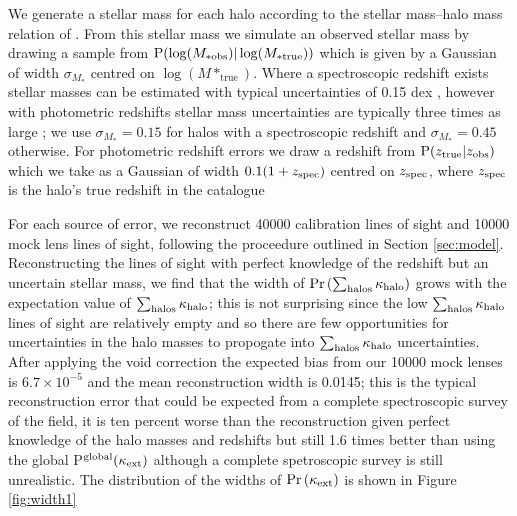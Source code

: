\documentclass[useAMS,usenatbib]{mn2e}
\begin{document}
We generate a stellar mass for each halo according to the stellar mass--halo mass relation of \citet{BehrooziEtal2010}. From this stellar mass we simulate 
an observed stellar mass by drawing a sample from ${\rm P}(\log(M_{* \mathrm {obs}})|\log(M_{* \mathrm {true}}))$ which is given by  a Gaussian of width $\sigma_{M_*}$ centred on $\log(M*_{\mathrm {true}})$. Where a spectroscopic redshift exists stellar masses can be estimated with typical uncertainties of 0.15 dex \citep{xxx}, however with photometric redshifts stellar mass uncertainties are typically three times as large \citep{xxx}; we use $\sigma_{M_*}=0.15$ for halos with a spectroscopic redshift and $\sigma_{M_*}=0.45$ otherwise.  For photometric redshift errors we draw a redshift from ${\rm P}(z_{\rm true}|z_{\rm obs})$ which we take as a Gaussian of width $0.1(1+z_{\rm spec})$ centred on $z_{\rm spec}$, where $z_{\rm spec}$ is the halo's true redshift in the \MS catalogue

For each  source of error, we reconstruct 40000 calibration lines of sight and 10000 mock lens lines of sight, following the proceedure outlined in Section \ref{sec:model}. Reconstructing the lines of sight with perfect knowledge of the redshift but an uncertain stellar mass, we find that the width of ${\rm Pr}\left(\sum_{\rm halos} \kappa_{\rm halo} \right)$ grows with the expectation value of $\sum_{\rm halos} \kappa_{\rm halo}$; this is not surprising since the low $\sum_{\rm halos} \kappa_{\rm halo}$ lines of sight are relatively empty and so there are few opportunities for uncertainties in the halo masses to propogate into $\sum_{\rm halos} \kappa_{\rm halo}$ uncertainties. After applying the void correction the expected bias from our 10000 mock lenses is $6.7\times 10^{-5}$ and the mean reconstruction width is 0.0145; this is the typical reconstruction error that could be expected from a complete spectroscopic survey of the field, it is ten percent worse than the reconstruction given perfect knowledge of the halo masses and redshifts but still 1.6 times better than using the global P$^{\rm global}(\kappa_{\rm ext})$ although a complete spetroscopic survey is still unrealistic. The distribution of the widths of ${\rm Pr}\left(\kappa_{\rm ext} \right)$ is shown in Figure \ref{fig:width1}
\end{document}
